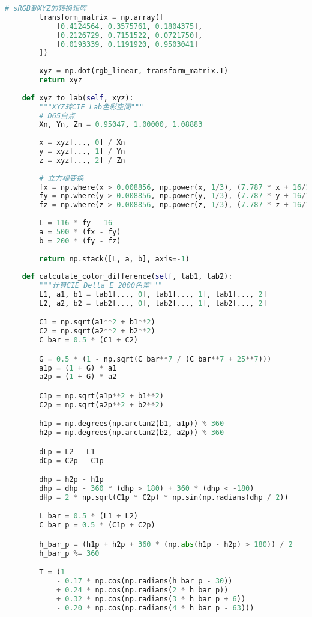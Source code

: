 \begin{lstlisting}[language=Python]
        # sRGB到XYZ的转换矩阵
        transform_matrix = np.array([
            [0.4124564, 0.3575761, 0.1804375],
            [0.2126729, 0.7151522, 0.0721750],
            [0.0193339, 0.1191920, 0.9503041]
        ])
        
        xyz = np.dot(rgb_linear, transform_matrix.T)
        return xyz
    
    def xyz_to_lab(self, xyz):
        """XYZ转CIE Lab色彩空间"""
        # D65白点
        Xn, Yn, Zn = 0.95047, 1.00000, 1.08883
        
        x = xyz[..., 0] / Xn
        y = xyz[..., 1] / Yn
        z = xyz[..., 2] / Zn
        
        # 立方根变换
        fx = np.where(x > 0.008856, np.power(x, 1/3), (7.787 * x + 16/116))
        fy = np.where(y > 0.008856, np.power(y, 1/3), (7.787 * y + 16/116))
        fz = np.where(z > 0.008856, np.power(z, 1/3), (7.787 * z + 16/116))
        
        L = 116 * fy - 16
        a = 500 * (fx - fy)
        b = 200 * (fy - fz)
        
        return np.stack([L, a, b], axis=-1)
    
    def calculate_color_difference(self, lab1, lab2):
        """计算CIE Delta E 2000色差"""
        L1, a1, b1 = lab1[..., 0], lab1[..., 1], lab1[..., 2]
        L2, a2, b2 = lab2[..., 0], lab2[..., 1], lab2[..., 2]

        C1 = np.sqrt(a1**2 + b1**2)
        C2 = np.sqrt(a2**2 + b2**2)
        C_bar = 0.5 * (C1 + C2)

        G = 0.5 * (1 - np.sqrt(C_bar**7 / (C_bar**7 + 25**7)))
        a1p = (1 + G) * a1
        a2p = (1 + G) * a2

        C1p = np.sqrt(a1p**2 + b1**2)
        C2p = np.sqrt(a2p**2 + b2**2)

        h1p = np.degrees(np.arctan2(b1, a1p)) % 360
        h2p = np.degrees(np.arctan2(b2, a2p)) % 360

        dLp = L2 - L1
        dCp = C2p - C1p

        dhp = h2p - h1p
        dhp = dhp - 360 * (dhp > 180) + 360 * (dhp < -180)
        dHp = 2 * np.sqrt(C1p * C2p) * np.sin(np.radians(dhp / 2))

        L_bar = 0.5 * (L1 + L2)
        C_bar_p = 0.5 * (C1p + C2p)

        h_bar_p = (h1p + h2p + 360 * (np.abs(h1p - h2p) > 180)) / 2
        h_bar_p %= 360

        T = (1
            - 0.17 * np.cos(np.radians(h_bar_p - 30))
            + 0.24 * np.cos(np.radians(2 * h_bar_p))
            + 0.32 * np.cos(np.radians(3 * h_bar_p + 6))
            - 0.20 * np.cos(np.radians(4 * h_bar_p - 63)))


\end{lstlisting}
